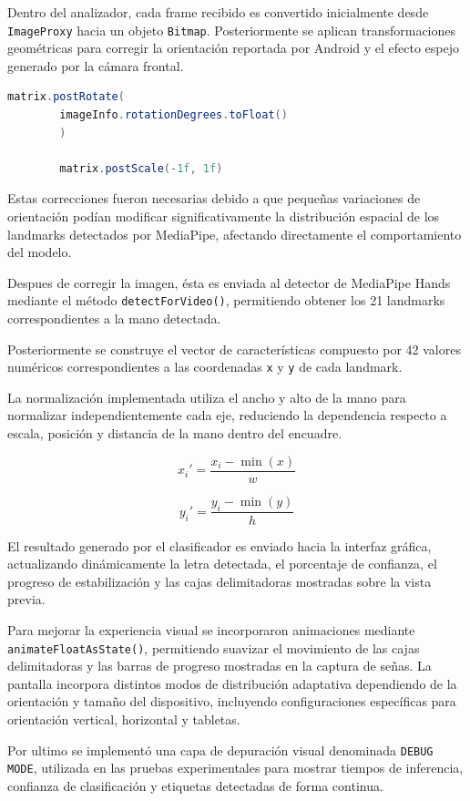 	Dentro del analizador, cada frame recibido es convertido inicialmente
	desde \texttt{ImageProxy} hacia un objeto \texttt{Bitmap}. Posteriormente
	se aplican transformaciones geométricas para corregir la orientación
	reportada por Android y el efecto espejo generado por la cámara frontal.
	
	\begin{lstlisting}[language=Java]
		matrix.postRotate(
		imageInfo.rotationDegrees.toFloat()
		)
		
		matrix.postScale(-1f, 1f)
	\end{lstlisting}
	
	Estas correcciones fueron necesarias debido a que pequeñas variaciones
	de orientación podían modificar significativamente la distribución espacial
	de los landmarks detectados por MediaPipe, afectando directamente el
	comportamiento del modelo.
	
	Despues de corregir la imagen, ésta es enviada al detector de MediaPipe
	Hands mediante el método \texttt{detectForVideo()}, permitiendo obtener
	los 21 landmarks correspondientes a la mano detectada.
	
	Posteriormente se construye el vector de características compuesto por
	42 valores numéricos correspondientes a las coordenadas \texttt{x} y
	\texttt{y} de cada landmark.
	
	La normalización implementada utiliza el ancho y alto de la mano para
	normalizar independientemente cada eje, reduciendo la dependencia
	respecto a escala, posición y distancia de la mano dentro del encuadre.
	
	\[
	x_i' =
	\frac{x_i - \min(x)}{w}
	\]
	
	\[
	y_i' =
	\frac{y_i - \min(y)}{h}
	\]
	
	El resultado generado por el clasificador es  enviado hacia
	la interfaz gráfica, actualizando dinámicamente la letra detectada,
	el porcentaje de confianza, el progreso de estabilización y las cajas
	delimitadoras mostradas sobre la vista previa.
	
	Para mejorar la experiencia visual se incorporaron animaciones mediante
	\texttt{animateFloatAsState()}, permitiendo suavizar el movimiento de
	las cajas delimitadoras y las barras de progreso mostradas en la
	captura de señas.
	La pantalla incorpora distintos modos de distribución
	adaptativa dependiendo de la orientación y tamaño del dispositivo,
	incluyendo configuraciones específicas para orientación vertical,
	horizontal y tabletas.
	
	Por ultimo se implementó una capa de depuración visual denominada
	\texttt{DEBUG MODE}, utilizada en las pruebas experimentales para
	mostrar tiempos de inferencia, confianza de clasificación y etiquetas
	detectadas de forma continua.

